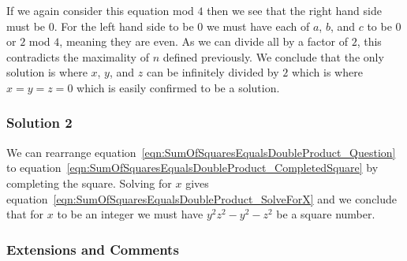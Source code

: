 If we again consider this equation mod $4$ then we see that the right hand side must be $0$. For the left hand side to be $0$ we must have each of $a$, $b$, and $c$ to be $0$ or $2$ mod $4$, meaning they are even. As we can divide all by a factor of $2$, this contradicts the maximality of $n$ defined previously. We conclude that the only solution is where $x$, $y$, and $z$ can be infinitely divided by $2$ which is where $x = y = z = 0$ which is easily confirmed to be a solution.

\subsubsection{Solution 2}

We can rearrange equation~\eqref{eqn:SumOfSquaresEqualsDoubleProduct_Question} to equation~\eqref{eqn:SumOfSquaresEqualsDoubleProduct_CompletedSquare} by completing the square. Solving for $x$ gives equation~\eqref{eqn:SumOfSquaresEqualsDoubleProduct_SolveForX} and we conclude that for $x$ to be an integer we must have $y^2 z^2 - y^2 - z^2$ be a square number.

\subsubsection{Extensions and Comments}

